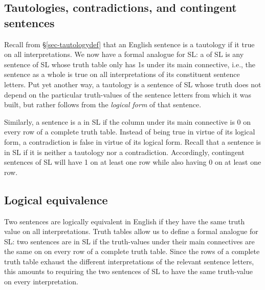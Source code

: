 \subsection{Tautologies, contradictions, and contingent sentences}

Recall from \S\ref{sec-tautologydef} that an English sentence is a tautology if it true on all interpretations.
We now have a formal analogue for SL: a  of SL is any sentence of SL whose truth table only has 1s under its main connective, i.e., the sentence as a whole is true on all interpretations of its constituent sentence letters.
Put yet another way, a tautology is a sentence of SL whose truth does not depend on the particular truth-values of the sentence letters from which it was built, but rather follows from the \textit{logical form} of that sentence.

Similarly, a sentence is a  in SL if the column under its main connective is 0 on every row of a complete truth table.
Instead of being true in virtue of its logical form, a contradiction is false in virtue of its logical form.
Recall that a sentence is  in SL if it is neither a tautology nor a contradiction.
Accordingly, contingent sentences of SL will have 1 on at least one row while also having 0 on at least one row.



\subsection{Logical equivalence}

Two sentences are logically equivalent in English if they have the same truth value on all interpretations.
Truth tables allow us to define a formal analogue for SL: two sentences are  in SL if the truth-values under their main connectives are the same on on every row of a complete truth table.
Since the rows of a complete truth table exhaust the different interpretations of the relevant sentence letters, this amounts to requiring the two sentences of SL to have the same truth-value on every interpretation.

